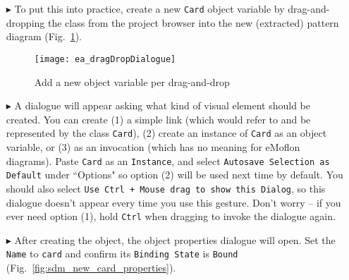 \begin{itemize}
The main advantage of drag-and-drop is that the \texttt{Object Variable Pro\-per\-ties} dialogue will have the type of the object pre-configured. Choosing
the type in the project browser and dragging it in is (for some people) a more natural gesture than choosing the type from a long drop-down menu (as we had to
when using the SDM toolbar). This can be a great time saver for large metamodels.\footnote{Drag-and-drop is also possible in embedded story patterns
(those still visualised in their story nodes).  You must ensure however, that the object variable is \emph{completely} contained inside the story node, and does
not stick out over any edge.}

\vspace{0.5cm}

\item[$\blacktriangleright$] To put this into practice, create a new \texttt{Card} object variable by drag-and-dropping the class from the project browser
into the new (extracted) pattern diagram (Fig.~\ref{fig:sdm_check_bound_card}).

\vspace{0.5cm}

\begin{figure}[htbp]
\begin{center}
  \texttt{[image: ea\_dragDropDialogue]}
  \caption{Add a new object variable per drag-and-drop}
  \label{fig:sdm_check_bound_card}
\end{center}
\end{figure}

\item[$\blacktriangleright$] A dialogue will appear asking what kind of visual element should be created. You can create (1) a simple link (which would refer to
and be represented by the class \texttt{Card}), (2) create an instance of \texttt{Card} as an object variable, or (3) as an invocation (which has no meaning
for eMoflon diagrams). Paste \texttt{Card} as an \texttt{Instance}, and select \texttt{Autosave Selection as Default} under ``Options" so option (2) will be
used next time by default. You should also select \texttt{Use Ctrl + Mouse drag to show this Dialog}, so this dialogue doesn't appear every time you use this
gesture. Don't worry -- if you ever need option (1), hold \texttt{Ctrl} when dragging to invoke the dialogue again.

\vspace{0.5cm}

\item[$\blacktriangleright$] After creating the object, the object properties dialogue will open.  Set the \texttt{Name} to \texttt{card} and confirm its
\texttt{Binding State} is \texttt{Bound} (Fig.~\ref{fig:sdm_new_card_properties}).


\end{itemize}
